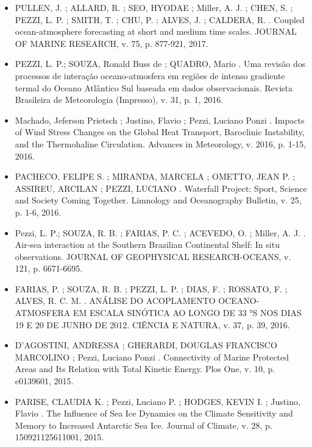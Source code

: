 \documentclass[11pt, a4paper]{awesome-cv}
\begin{document}
\begin{cvletter}
\begin{itemize}
  \item[] PULLEN, J. ; ALLARD, R. ; SEO, HYODAE ; Miller, A. J. ; CHEN, S. ; PEZZI, L. P. ; SMITH, T. ; 
  CHU, P. ; ALVES, J. ; CALDERA, R. . Coupled ocean-atmosphere forecasting at short and medium time 
  scales. JOURNAL OF MARINE RESEARCH, v. 75, p. 877-921,
  2017.

  \item[] PEZZI, L. P.; SOUZA, Ronald Buss de ; QUADRO, Mario . Uma revisão dos processos de interação 
  oceano-atmosfera em regiões de intenso gradiente termal do Oceano Atlântico Sul baseada em dados 
  observacionais. Revista Brasileira de Meteorologia (Impresso), v. 31, p. 1,
  2016.

  \item[] Machado, Jeferson Prietsch ; Justino, Flavio ; Pezzi, Luciano Ponzi . Impacts of Wind Stress 
  Changes on the Global Heat Transport, Baroclinic Instability, and the Thermohaline Circulation. 
  Advances in Meteorology, v. 2016, p. 1-15,
  2016.

  \item[] PACHECO, FELIPE S. ; MIRANDA, MARCELA ; OMETTO, JEAN P. ; ASSIREU, ARCILAN ; PEZZI, LUCIANO . 
  Waterfall Project: Sport, Science and Society Coming Together. Limnology and Oceanography Bulletin, 
  v. 25, p. 1-6, 2016.

  \item[] Pezzi, L. P.; SOUZA, R. B. ; FARIAS, P. C. ; ACEVEDO, O. ; Miller, A. J. . Air-sea 
  interaction at the Southern Brazilian Continental Shelf: In situ observations. JOURNAL OF 
  GEOPHYSICAL RESEARCH-OCEANS, v. 121, p. 6671-6695.

  \item[] FARIAS, P. ; SOUZA, R. B. ; PEZZI, L. P. ; DIAS, F. ; ROSSATO, F. ; ALVES, R. C. M. . 
  ANÁLISE DO ACOPLAMENTO OCEANO-ATMOSFERA EM ESCALA SINÓTICA AO LONGO DE 33 °S NOS DIAS 19 E 20 DE 
  JUNHO DE 2012. CIÊNCIA E NATURA, v. 37, p. 39, 2016.

  \item[] D'AGOSTINI, ANDRESSA ; GHERARDI, DOUGLAS FRANCISCO MARCOLINO ; Pezzi, Luciano Ponzi . 
  Connectivity of Marine Protected Areas and Its Relation with Total Kinetic Energy. Plos One, v. 10, 
  p. e0139601, 2015.

  \item[] PARISE, CLAUDIA K. ; Pezzi, Luciano P. ; HODGES, KEVIN I. ; Justino, Flavio . The Influence 
  of Sea Ice Dynamics on the Climate Sensitivity and Memory to Increased Antarctic Sea Ice. 
  Journal of Climate, v. 28, p. 150921125611001,
  2015.


\end{itemize}
\end{cvletter}
\end{document}
